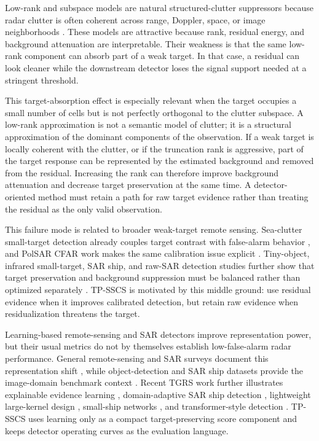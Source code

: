 \documentclass[journal]{IEEEtran}
\begin{document}
Low-rank and subspace models are natural structured-clutter suppressors because radar clutter is often coherent across range, Doppler, space, or image neighborhoods \cite{candes2011rpca,vaswani2018robustsubspace}. These models are attractive because rank, residual energy, and background attenuation are interpretable. Their weakness is that the same low-rank component can absorb part of a weak target. In that case, a residual can look cleaner while the downstream detector loses the signal support needed at a stringent threshold.

This target-absorption effect is especially relevant when the target occupies a small number of cells but is not perfectly orthogonal to the clutter subspace. A low-rank approximation is not a semantic model of clutter; it is a structural approximation of the dominant components of the observation. If a weak target is locally coherent with the clutter, or if the truncation rank is aggressive, part of the target response can be represented by the estimated background and removed from the residual. Increasing the rank can therefore improve background attenuation and decrease target preservation at the same time. A detector-oriented method must retain a path for raw target evidence rather than treating the residual as the only valid observation.

This failure mode is related to broader weak-target remote sensing. Sea-clutter small-target detection already couples target contrast with false-alarm behavior \cite{panagopoulos2004smalltarget}, and PolSAR CFAR work makes the same calibration issue explicit \cite{liu2020polsarcfar}. Tiny-object, infrared small-target, SAR ship, and raw-SAR detection studies further show that target preservation and background suppression must be balanced rather than optimized separately \cite{chen2022drenet,liu2025pgdn,wang2019ssdd,leng2023rawsar}. TP-SSCS is motivated by this middle ground: use residual evidence when it improves calibrated detection, but retain raw evidence when residualization threatens the target.

Learning-based remote-sensing and SAR detectors improve representation power, but their usual metrics do not by themselves establish low-false-alarm radar performance. General remote-sensing and SAR surveys document this representation shift \cite{zhu2017deeprs,zhu2021deeplearningsar,eldarymli2016saratr}, while object-detection and SAR ship datasets provide the image-domain benchmark context \cite{zou2018ram,zhang2021ssdd,huang2018opensarship,wei2020hrsid,chen2022contrastive}. Recent TGRS work further illustrates explainable evidence learning \cite{liu2024evidence}, domain-adaptive SAR ship detection \cite{zhou2024fewshot}, lightweight large-kernel design \cite{shen2024ellknet}, small-ship networks \cite{ma2024ssdnet}, and transformer-style detection \cite{qin2025rdbdino}. TP-SSCS uses learning only as a compact target-preserving score component and keeps detector operating curves as the evaluation language.
\end{document}
